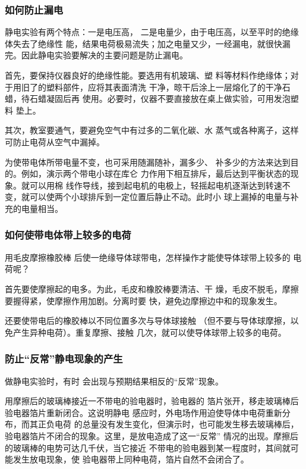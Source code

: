 \subsubsection{如何防止漏电}

静电实验有两个特点：一是电压高，
二是电量少，由于电压高，以至平时的绝缘体失去了绝缘性
能，结果电荷极易流失；加之电量又少，一经漏电，就很快漏
完。因此静电实验要解决的主要问题是防止漏电。

首先，要保持仪器良好的绝缘性能。要选用有机玻璃、塑
料等材料作绝缘体；对于用旧了的塑料部件，应将其表面清洗
干净，晾干后涂上一层熔化了的干净石蜡，待石蜡凝固后再
使用。必要时，仪器不要直接放在桌上做实验，可用发泡塑料
垫上。

其次，教室要通气，要避免空气中有过多的二氧化碳、水
蒸气或各种离子，这样可防止电荷从空气中漏掉。

为使带电体所带电量不变，也可采用随漏随补，漏多少、
补多少的方法来达到目的。例如，演示两个带电小球在库仑
力作用下相互排斥，最后达到平衡状态的现象。就可以用棉
线作导线，接到起电机的电极上，轻摇起电机逐渐达到转速不
变，就可以使两个小球排斥到一定位置后静止不动。此时小
球上漏掉的电量与补充的电量相当。


\subsubsection{如何使带电体带上较多的电荷}
用毛皮摩擦橡胶棒
后使一绝缘导体球带电，怎样操作才能使导体球带上较多的
电荷呢？

首先要使摩擦起的电多。为此，毛皮和橡胶棒要清洁、干
燥，毛皮不脱毛，摩擦要握得紧，使摩擦作用加剧。分离时要
快，避免边摩擦边中和的现象发生。

还要使带电后的橡胶棒以不同位置多次与导体球接触
（但不要与导体球摩擦，以免产生异种电荷）。重复摩擦、接触
几次，就可以使导体球带上较多的电荷。

\subsubsection{防止“反常”静电现象的产生}

做静电实验时，有时
会出现与预期结果相反的“反常”现象。

用摩擦后的玻璃棒接近一不带电的验电器时，验电器的
箔片张开，移走玻璃棒后验电器箔片重新闭合。这说明静电
感应时，外电场作用迫使导体中电荷重新分布，而其正负电荷
的总量没有发生变化，但演示时，也可能发生移去玻璃棒后，
验电器箔片不闭合的现象。这里，是放电造成了这一“反常”
情况的出现。摩擦后的玻璃棒的电势可达几千伏，当它接近
不带电的验电器到某一程度时，其间就可能发生放电现象，使
验电器带上同种电荷，箔片自然不会闭合了。


